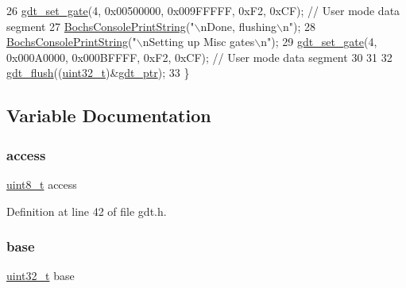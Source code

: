 \begin{DoxyCode}
26     \hyperlink{a00080_abcf0775ea602ace125ae809475b6d8bf_abcf0775ea602ace125ae809475b6d8bf}{gdt\_set\_gate}(4, 0x00500000, 0x009FFFFF, 0xF2, 0xCF); \textcolor{comment}{// User mode data segment}
27     \hyperlink{a00056_a19e1f554d03c977f8b947f21489daa41_a19e1f554d03c977f8b947f21489daa41}{BochsConsolePrintString}(\textcolor{stringliteral}{"\(\backslash\)nDone, flushing\(\backslash\)n"});
28     \hyperlink{a00056_a19e1f554d03c977f8b947f21489daa41_a19e1f554d03c977f8b947f21489daa41}{BochsConsolePrintString}(\textcolor{stringliteral}{"\(\backslash\)nSetting up Misc gates\(\backslash\)n"});
29     \hyperlink{a00080_abcf0775ea602ace125ae809475b6d8bf_abcf0775ea602ace125ae809475b6d8bf}{gdt\_set\_gate}(4, 0x000A0000, 0x000BFFFF, 0xF2, 0xCF); \textcolor{comment}{// User mode data segment}
30 
31 
32     \hyperlink{a00083_a62397fecbde23244b570ae632fe926fa_a62397fecbde23244b570ae632fe926fa}{gdt\_flush}((\hyperlink{a00116_a435d1572bf3f880d55459d9805097f62_a435d1572bf3f880d55459d9805097f62}{uint32\_t})&\hyperlink{a00083_ab0888c07dfb9352ef76d05e63464cf0b_ab0888c07dfb9352ef76d05e63464cf0b}{gdt\_ptr});
33 \}
\end{DoxyCode}


\subsection{Variable Documentation}
\mbox{\label{a00083_a8b0d6200bc639dd37ff68847a0adde5f_a8b0d6200bc639dd37ff68847a0adde5f}} 
\subsubsection{\texorpdfstring{access}{access}}
{\footnotesize\ttfamily \hyperlink{a00116_aba7bc1797add20fe3efdf37ced1182c5_aba7bc1797add20fe3efdf37ced1182c5}{uint8\+\_\+t} access}



Definition at line 42 of file gdt.\+h.

\mbox{\label{a00083_a0523cedff47e2441fc198b7770ec5d3f_a0523cedff47e2441fc198b7770ec5d3f}} 
\subsubsection{\texorpdfstring{base}{base}}
{\footnotesize\ttfamily \hyperlink{a00116_a435d1572bf3f880d55459d9805097f62_a435d1572bf3f880d55459d9805097f62}{uint32\+\_\+t} base}




